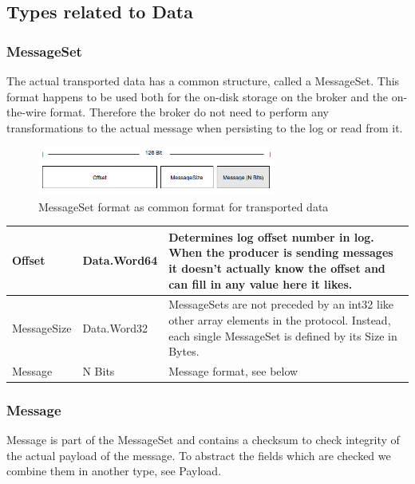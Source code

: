 \subsection{Types related to Data}
\label{impl-protocol-types-data}
\subsubsection{MessageSet}
The actual transported data has a common structure,
called a MessageSet. This format happens to be used both for the on-disk storage on the
broker and the on-the-wire format. Therefore the broker do not need to perform
any transformations to the actual message when persisting to the log or read
from it. 

\begin{figure}[H]
    \centering
    \includegraphics[width=0.7\textwidth]{images/impl-prot-types-messageSet.png}
    \caption{MessageSet format as common format for transported data}
    \label{fig:impl-prot-types-messageSet}
\end{figure}

\begin{table}[H]
\centering
\begin{tabular}{ l  l  p{11cm} }
\hline
Offset      & Data.Word64 & Determines log offset number in log.  When the producer is sending messages it doesn't actually know the offset and can fill in any value here it likes. \\ \hline
MessageSize & Data.Word32 & MessageSets are not preceded by an int32 like other array elements in the protocol. Instead, each single MessageSet is defined by its Size in Bytes.               \\ \hline
Message     & N Bits     & Message format, see below                                                                                                                                \\ \hline
\end{tabular}
\end{table}

\subsubsection{Message}
Message is part of the MessageSet and contains a checksum to check integrity of
the actual payload of the message. To abstract the fields which are checked we
combine them in another type, see Payload.

